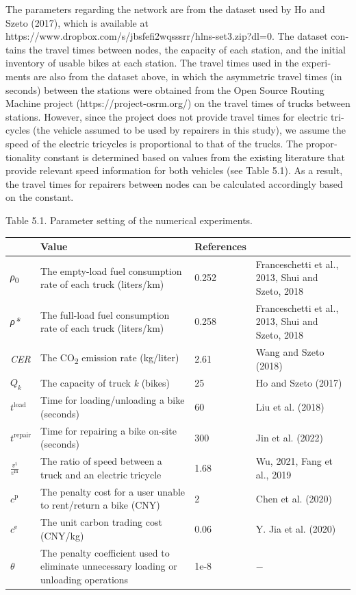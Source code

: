 \documentclass[
  english,
]{article}
\newcounter{none} %
\begin{document}
\begin{otherlanguage}{english}
\protect{}\label{p0615}
The parameters regarding the network are from the dataset used by Ho and Szeto (2017), which is
available at https://www.dropbox.com/s/jbsfefi2wqsssrr/hlns-set3.zip?dl=0. The dataset contains the
travel times between nodes, the capacity of each station, and the initial inventory of usable bikes
at each station. The travel times used in the experiments are also from the dataset above, in which
the asymmetric travel times (in seconds) between the stations were obtained from the Open Source
Routing Machine project (https://project-osrm.org/) on the travel times of trucks between stations.
However, since the project does not provide travel times for electric tricycles (the vehicle assumed
to be used by repairers in this study), we assume the speed of the electric tricycles is
proportional to that of the trucks. The proportionality constant is determined based on values from
the existing literature that provide relevant speed information for both vehicles (see Table 5.1).
As a result, the travel times for repairers between nodes can be calculated accordingly based on the
constant.

\protect{}\label{t0010}
Table 5.1. Parameter setting of the numerical experiments.

{\def\LTcaptype{none} %
\begin{longtable}[]{@{}llll@{}}
\toprule\noalign{}
\multicolumn{2}{@{}l}{%
Parameter} & Value & References \\
\midrule\noalign{}
\endhead
\bottomrule\noalign{}
\endlastfoot
\emph{ρ}\textsubscript{0} & The empty-load fuel consumption rate of each truck (liters/km) & 0.252 &
Franceschetti et al., 2013, Shui and Szeto, 2018 \\
\emph{ρ*} & The full-load fuel consumption rate of each truck (liters/km) & 0.258 & Franceschetti et
al., 2013, Shui and Szeto, 2018 \\
\emph{CER} & The CO\textsubscript{2} emission rate (kg/liter) & 2.61 & Wang and Szeto (2018) \\
\(Q_{k}\) & The capacity of truck \emph{k} (bikes) & 25 & Ho and Szeto (2017) \\
\(t^{\text{load}}\) & Time for loading/unloading a bike (seconds) & 60 & Liu et al. (2018) \\
\(t^{\text{repair}}\) & Time for repairing a bike on-site (seconds) & 300 & Jin et al. (2022) \\
\(\frac{v^{\text{t}}}{v^{\text{m}}}\) & The ratio of speed between a truck and an electric tricycle
& 1.68 & Wu, 2021, Fang et al., 2019 \\
\(c^{\text{p}}\) & The penalty cost for a user unable to rent/return a bike (CNY) & 2 & Chen et al.
(2020) \\
\(c^{\text{e}}\) & The unit carbon trading cost (CNY/kg) & 0.06 & Y. Jia et al. (2020) \\
\(\theta\) & The penalty coefficient used to eliminate unnecessary loading or unloading operations &
1e-8 & − \\
\end{longtable}
}


\end{otherlanguage}
\end{document}
